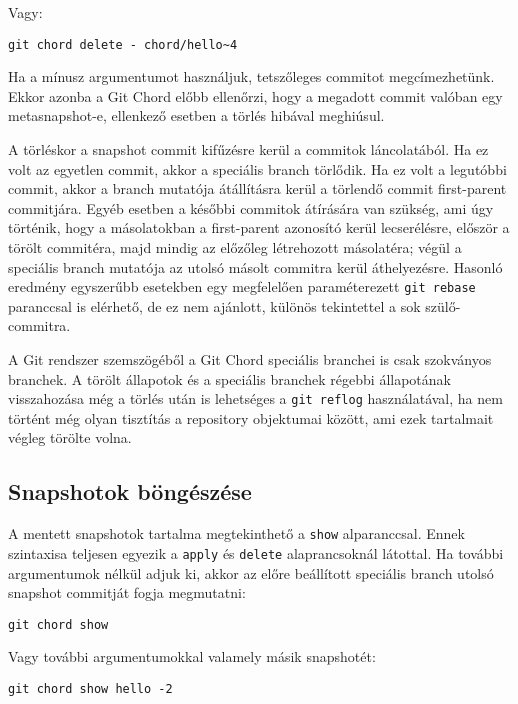 \documentclass[
]{elteikthesis}[2025/03/25]
\begin{document}
Vagy:

\begin{verbatim}
git chord delete - chord/hello~4
\end{verbatim}

Ha a mínusz argumentumot használjuk, tetszőleges commitot megcímezhetünk.
Ekkor azonba a Git Chord előbb ellenőrzi,
hogy a megadott commit valóban egy metasnapshot-e,
ellenkező esetben a törlés hibával meghiúsul.

A törléskor a snapshot commit kifűzésre kerül a commitok láncolatából.
Ha ez volt az egyetlen commit, akkor a speciális branch törlődik.
Ha ez volt a legutóbbi commit, akkor a branch mutatója átállításra kerül
a törlendő commit first-parent commitjára.
Egyéb esetben a későbbi commitok átírására van szükség,
ami úgy történik, hogy a másolatokban a first-parent azonosító kerül lecserélésre,
először a törölt commitéra, majd mindig az előzőleg létrehozott másolatéra;
végül a speciális branch mutatója az utolsó másolt commitra kerül áthelyezésre.
Hasonló eredmény egyszerűbb esetekben egy megfelelően paraméterezett \verb|git rebase|
paranccsal is elérhető,
de ez nem ajánlott, különös tekintettel a sok szülő-commitra.

A Git rendszer szemszögéből a Git Chord speciális branchei is csak szokványos branchek.
A törölt állapotok és a speciális branchek régebbi állapotának visszahozása
még a törlés után is lehetséges a \verb|git reflog| használatával,
ha nem történt még olyan tisztítás a repository objektumai között,
ami ezek tartalmait végleg törölte volna.

\subsection{Snapshotok böngészése}

A mentett snapshotok tartalma megtekinthető a \verb|show| alparanccsal.
Ennek szintaxisa teljesen egyezik a \verb|apply| és \verb|delete| alaprancsoknál látottal.
Ha további argumentumok nélkül adjuk ki, akkor az előre beállított speciális branch
utolsó snapshot commitját fogja megmutatni:

\begin{verbatim}
git chord show
\end{verbatim}

Vagy további argumentumokkal valamely másik snapshotét:

\begin{verbatim}
git chord show hello -2
\end{verbatim}
\end{document}
